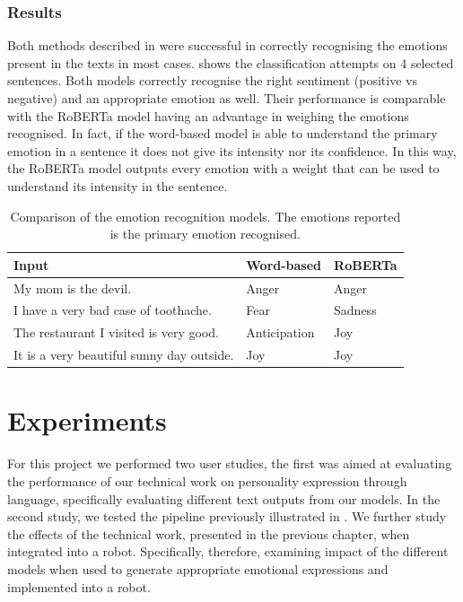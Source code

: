\documentclass[nomenclature, english, biblatex]{kththesis}
\begin{document}
\subsection{Results}
Both methods described in  were successful in correctly recognising the emotions present in the texts in most cases.  shows the classification attempts on 4 selected sentences. Both models correctly recognise the right sentiment (positive vs negative) and an appropriate emotion as well. Their performance is comparable with the RoBERTa model having an advantage in weighing the emotions recognised. In fact, if the word-based model is able to understand the primary emotion in a sentence it does not give its intensity nor its confidence. In this way, the RoBERTa model outputs every emotion with a weight that can be used to understand its intensity in the sentence.
\begin{table}
    \centering
    \begin{adjustbox}{max width=\textwidth}
        \begin{tabular}{|p{}|p{}|p{}|}
        \hline
        Input & Word-based & RoBERTa \\
        \hline
        \hline
        My mom is the devil. & Anger & Anger\\
        \hline
        I have a very bad case of toothache. & Fear & Sadness \\
        \hline
        The restaurant I visited is very good. & Anticipation & Joy\\
        \hline
        It is a very beautiful sunny day outside. & Joy & Joy\\
        \hline
        \end{tabular}
    \end{adjustbox}
    \caption{Comparison of the emotion recognition models. The emotions reported is the primary emotion recognised.}
    \label{tab:emotions}
\end{table}

\chapter{Experiments}
\label{ch:experiments}
For this project we performed two user studies, the first was aimed at evaluating the performance of our technical work on personality expression through language, specifically evaluating different text outputs from our models. In the second study, we tested the pipeline previously illustrated in . We further study the effects of the technical work, presented in the previous chapter, when integrated into a robot. Specifically, therefore, examining impact of the different models when used to generate appropriate emotional expressions and implemented into a robot.
\end{document}
